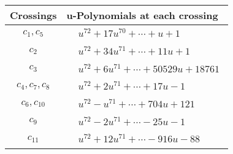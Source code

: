 \documentclass[1p]{elsarticle_modified}
\theoremstyle{definition}
\begin{document}
\begin{tabular}{m{50pt}|m{274pt}}
Crossings & \hspace{64pt}u-Polynomials at each crossing \\
\hline $$\begin{aligned}c_{1},c_{5}\end{aligned}$$&$\begin{aligned}
&u^{72}+17 u^{70}+\cdots+u+1
\end{aligned}$\\
\hline $$\begin{aligned}c_{2}\end{aligned}$$&$\begin{aligned}
&u^{72}+34 u^{71}+\cdots+11 u+1
\end{aligned}$\\
\hline $$\begin{aligned}c_{3}\end{aligned}$$&$\begin{aligned}
&u^{72}+6 u^{71}+\cdots+50529 u+18761
\end{aligned}$\\
\hline $$\begin{aligned}c_{4},c_{7},c_{8}\end{aligned}$$&$\begin{aligned}
&u^{72}+2 u^{71}+\cdots+17 u-1
\end{aligned}$\\
\hline $$\begin{aligned}c_{6},c_{10}\end{aligned}$$&$\begin{aligned}
&u^{72}- u^{71}+\cdots+704 u+121
\end{aligned}$\\
\hline $$\begin{aligned}c_{9}\end{aligned}$$&$\begin{aligned}
&u^{72}-2 u^{71}+\cdots-25 u-1
\end{aligned}$\\
\hline $$\begin{aligned}c_{11}\end{aligned}$$&$\begin{aligned}
&u^{72}+12 u^{71}+\cdots-916 u-88
\end{aligned}$\\
\hline
\end{tabular}\\~\\
\newpage\renewcommand{\arraystretch}{1}
\end{document}
